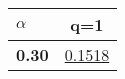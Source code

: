 \begin{tabular}{ | l || c |}
\hline
\textbf{$\alpha$} & \textbf{}q=1} \\
\hline
\textbf{0.30} & \underline{0.1518}\\
\hline
\end{tabular}
